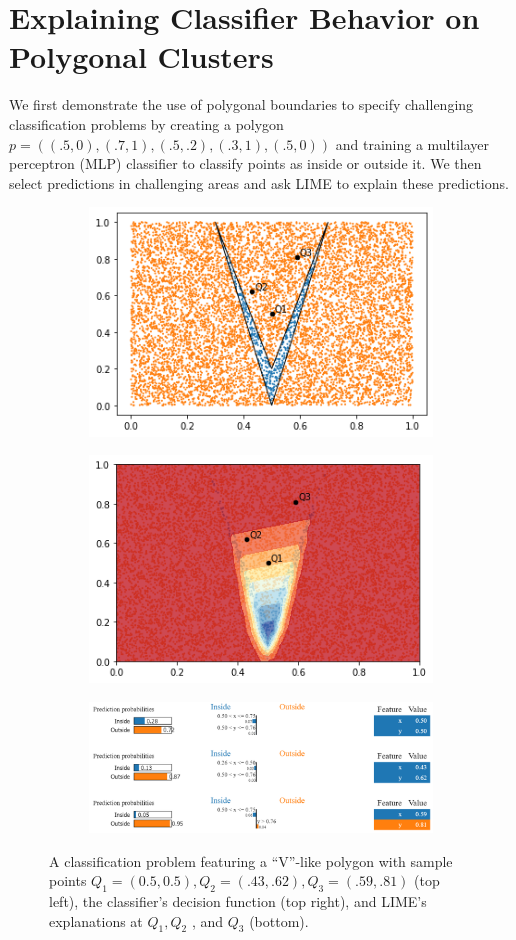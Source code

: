 \documentclass[manuscript,screen,review]{acmart}
\begin{document}
\section{Explaining Classifier Behavior on Polygonal Clusters}

We first demonstrate the use of polygonal boundaries to specify challenging classification problems by creating a polygon
$p = ((.5, 0), (.7, 1), (.5,.2), (.3, 1), (.5, 0))$ and training a multilayer perceptron (MLP) classifier to classify points as inside or outside it.
We then select predictions in challenging areas and ask LIME to explain these predictions.
\begin{figure}
    \centering
    \begin{subfigure}
        \centering
        \includegraphics[width=.4\textwidth]{images/lime-corner-plot.png}
        \label{lime-corner-plot}
    \end{subfigure}
    \begin{subfigure}
        \centering
        \includegraphics[width=.4\textwidth]{images/lime-corner-prob.png}
        \label{lime-corner-probs}
    \end{subfigure}
    \begin{subfigure}
        \centering
        \includegraphics[width=.8\textwidth]{images/lime-corner-exps.png}
        \label{lime-corner-exps}
    \end{subfigure}
    \caption{
        A classification problem featuring a ``V''-like polygon with sample points $Q_1 = (0.5, 0.5), Q_2 = (.43, .62), Q_3 = (.59, .81)$ (top left), the classifier's decision function (top right), and LIME's explanations at $Q_1, Q_2$ , and $Q_3$ (bottom).
    }
    \label{fig:corner}
\end{figure}
\end{document}
